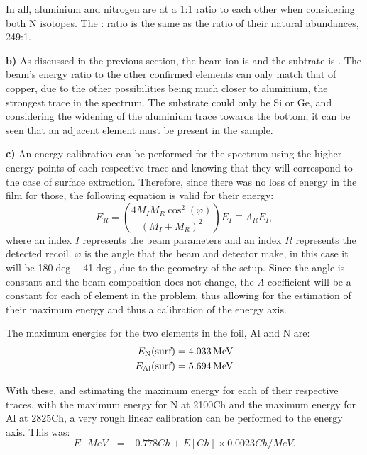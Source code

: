 In all, aluminium and nitrogen are at a 1:1 ratio to each other when considering both N isotopes. The : ratio is the same as the ratio of their natural abundances, 249:1. 

\textbf{b)} As discussed in the previous section, the beam ion is  and the subtrate is . The beam's energy ratio to the other confirmed elements can only match that of copper, due to the other possibilities being much closer to aluminium, the strongest trace in the spectrum. The substrate could only be Si or Ge, and considering the widening of the aluminium trace towards the bottom, it can be seen that an adjacent element must be present in the sample. 

\textbf{c)} An energy calibration can be performed for the spectrum using the higher energy points of each respective trace and knowing that they will correspond to the case of surface extraction. Therefore, since there was no loss of energy in the film for those, the following equation is valid for their energy:
\begin{equation}
    E_R = \left(\frac{4M_IM_R \cos^2(\varphi)}{(M_I+M_R)^2}\right)E_I \equiv \Lambda_R E_I,
\end{equation} where an index $I$ represents the beam parameters and an index $R$ represents the detected recoil. $\varphi$ is the angle that the beam and detector make, in this case it will be 180$\deg$ - 41$\deg$, due to the geometry of the setup. Since the angle is constant and the beam composition does not change, the $\Lambda$ coefficient will be a constant for each of element in the problem, thus allowing for the estimation of their maximum energy and thus a calibration of the energy axis.

The maximum energies for the two elements in the foil, Al and N are: 
\begin{align}
    \label{eq:Emax}
    E_{\ce{N}}  (\text{surf}) = 4.033\unit{MeV}\\
    E_{\ce{Al}} (\text{surf}) = 5.694\unit{MeV}
\end{align}

With these, and estimating the maximum energy for each of their respective traces, with the maximum energy for N at 2100\unit{Ch} and the maximum energy for Al at 2825\unit{Ch}, a very rough linear calibration can be performed to the energy axis. This was:
\begin{equation}
    \label{eq:Ecal}
    E[MeV] = -0.778\unit{Ch} + E[Ch]\times0.0023\unit{Ch/MeV}.
\end{equation}

